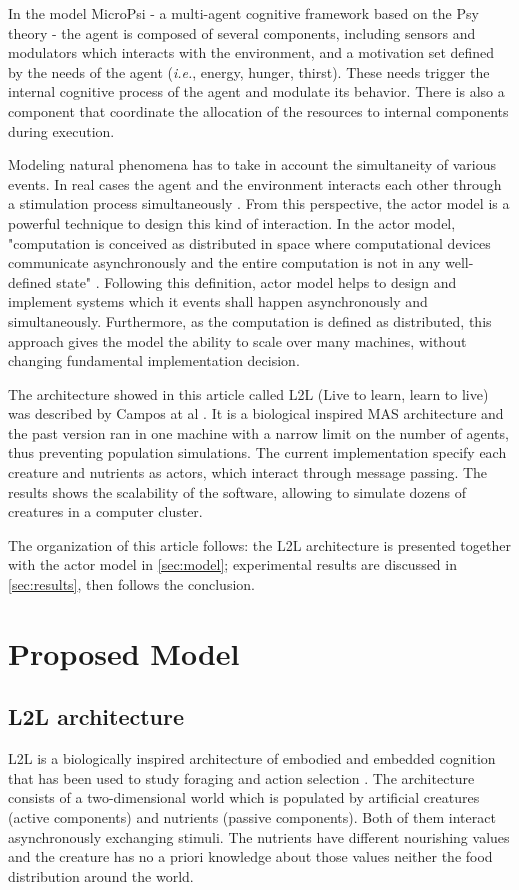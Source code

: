 \documentclass{aamas2017}
\begin{document}
In the model MicroPsi - a multi-agent cognitive framework based on the Psy theory \cite{Bach2003, Bach2012} - the agent is composed of several components, including sensors and modulators which interacts with the environment, and a motivation set defined by the needs of the agent (\textit{i.e.},  energy, hunger, thirst). These needs trigger the internal cognitive process of the agent and modulate its behavior. There is also a component that coordinate the allocation of the resources to internal components during execution. 

Modeling natural phenomena has to take in account the simultaneity of various events. In real cases the agent and the environment interacts each other through a stimulation process simultaneously \cite{Maturana1987}. From this perspective, the actor model is a powerful technique to design this kind of interaction. In the actor model, "computation  is  conceived  as  distributed  in space where computational devices communicate asynchronously and the entire  computation  is  not  in  any  well-defined  state" \cite{Hewitt2012}. Following this definition, actor model helps to design and implement systems which it events  shall happen asynchronously and simultaneously. Furthermore, as the computation is defined as distributed, this approach gives the model the ability to scale over many machines, without changing fundamental implementation decision. 

The architecture showed in this article called L2L (Live to learn, learn to live) was described by Campos at al \cite{Campos}. It is a biological inspired MAS architecture and the past version ran in one machine with a narrow limit on the number of agents, thus preventing population simulations. The current implementation specify each creature and nutrients as actors, which interact through message passing. The results shows the scalability of the software, allowing to simulate dozens of creatures in a computer cluster. 

The organization of this article follows: the L2L architecture is presented together with the actor model in \autoref{sec:model}; experimental results are discussed in \autoref{sec:results}, then follows the conclusion.

\section{Proposed Model}
\label{sec:model}

\subsection{L2L architecture}
\label{subsec:l2l}
L2L is a biologically inspired architecture of embodied and embedded cognition that has been used to study foraging and action selection \cite{Campos}. The architecture consists of a two-dimensional world which is populated by artificial creatures (active components) and nutrients (passive components). Both of them interact asynchronously exchanging stimuli. The nutrients have different nourishing values and the creature has no a priori knowledge about those values neither the food distribution around the world. 
\end{document}
